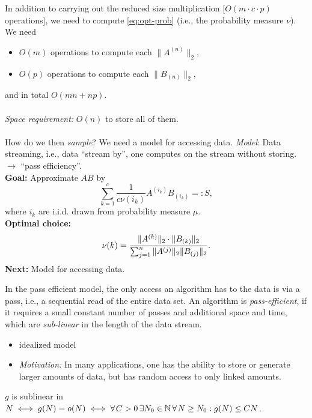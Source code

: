 In addition to carrying out the reduced size multiplication [$O(m\cdot c \cdot p)$ operations], we need to compute \eqref{eq:opt-prob} (i.e., the probability measure $\nu$). We need
\begin{itemize}
	\item $O(m)$ operations to compute each $\|A^{(n)}\|_2$,
	\item $O(p)$ operations to compute each $\|B_{(n)}\|_2$,
\end{itemize}
and in total $O(mn+np)$. \\\\
\emph{Space requirement:} $O(n)$ to store all of them.\\\\
How do we then \emph{sample}? We need a model for accessing data. \emph{Model}: Data streaming, i.e., data ``stream by'', one computes on the stream without storing. $\to$ ``pass efficiency''.\\\drawaline
{}
\textbf{Goal:} Approximate $AB$ by
\begin{equation*}
\sum_{k=1}^c \frac{1}{c\nu(i_k)} A^{(i_k)} B_{(i_k)} =: S,
\end{equation*}
where $i_k$ are i.i.d. drawn from probability measure $\mu$.\vspace{0.5pc} \\
\textbf{Optimal choice:}
\begin{equation*}
\nu(k) = \frac{\| A^{(k)}\|_2 \cdot \|B_{(k)}\|_2}{\sum_{j=1}^n \|A^{(j)}\|_2 \|B_{(j)}\|_2}.\vspace{0.5pc}
\end{equation*}
\textbf{Next:} Model for accessing data.
\begin{definition}
\begin{mdframed}
In the pass efficient model, the only access an algorithm has to the data is via a pass, i.e., a sequential read of the entire data set. An algorithm is \emph{pass-efficient}, if it requires a small constant number of passes and additional space and time, which are \emph{sub-linear} in the length of the data stream.
\end{mdframed} \vspace{-1pc}
\begin{itemize}[-,itemsep=0pt]
\item idealized model
\item \emph{Motivation:} In many applications, one has the ability to store or generate larger amounts of data, but has random access to only linked amounts. 
\end{itemize}
$g$ is sublinear in $N \iff g(N) = o(N) \iff \forall C >0 \, \exists N_0 \in \N \, \forall N \geq N_0: g(N) \leq CN$. 
\end{definition}
